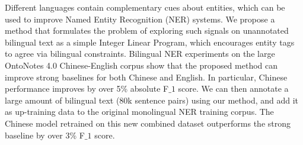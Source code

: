 Different languages contain complementary cues about entities, which can be used to improve Named Entity Recognition (NER) systems.
 We propose a method that formulates the problem of exploring such 
 signals on unannotated bilingual text as a simple Integer Linear Program, 
 which encourages entity tags to agree via bilingual constraints.
 Bilingual NER experiments on the large OntoNotes 4.0 Chinese-English corpus
 show 
 that the proposed method can improve strong baselines for both Chinese and
 English.
 In particular, Chinese performance improves by over 5\% absolute F$\_1$ score.
 We can then annotate a large amount of bilingual text (80k sentence pairs)
 using our method, 
 and add it as up-training data to the original monolingual NER training corpus.
 The Chinese model retrained on this new combined dataset outperforms 
 the strong baseline by over 3\% F$\_1$ score.

